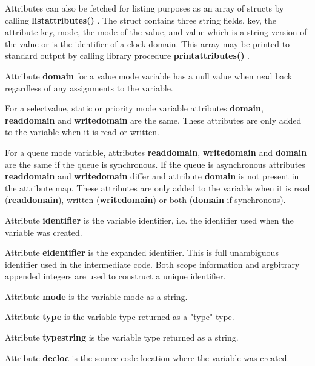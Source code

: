             Attributes can also be fetched for listing purposes as an array of
            structs by calling {\bf listattributes()} .
            The struct contains three string fields, key, the attribute key,
            mode, the mode of the value, and value which is a string version
            of the value or is the identifier of a clock domain. This array
            may be printed to standard output by calling library procedure
            {\bf printattributes()} .
            
            Attribute {\bf domain} for a value mode variable has a
            null value when read back regardless of any assignments to
            the variable.

            For a selectvalue, static or priority mode variable attributes
            {\bf domain}, {\bf readdomain} and {\bf writedomain} are the same.
            These attributes are only added to the variable when it is
            read or written.
            
            For a queue mode variable, attributes {\bf readdomain}, {\bf
            writedomain} and {\bf domain} are the same if the queue is
            synchronous. If the queue is asynchronous attributes {\bf readdomain}
            and {\bf writedomain} differ and attribute {\bf domain} is not
            present in the attribute map. These attributes are only added to the
            variable when it is read ({\bf readdomain}), written ({\bf writedomain})
            or both ({\bf domain} if synchronous).
            
            Attribute {\bf identifier} is the variable identifier, i.e. the
            identifier used when the variable was created.

            Attribute {\bf eidentifier} is the expanded identifier. This is
            full unambiguous identifier used in the intermediate code. Both
            scope information and argbitrary appended integers are used to
            construct a unique identifier.
            
            Attribute {\bf mode} is the variable mode as a string.
            
            Attribute {\bf type} is the variable type returned as a "type" type.

            Attribute {\bf typestring} is the variable type returned as a string.

            Attribute {\bf decloc} is the source code location where the variable
            was created.
            
